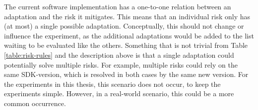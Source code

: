 The current software implementation has a one-to-one relation between an adaptation and the risk it mitigates. This means that an individual risk only has (at most) a single possible adaptation. Conceptually, this should not change or influence the experiment, as the additional adaptations would be added to the list waiting to be evaluated like the others. Something that is not trivial from Table \ref{table:risk-rules} and the description above is that a single adaptation could potentially solve multiple risks. For example, multiple risks could rely on the same SDK-version, which is resolved in both cases by the same new version. For the experiments in this thesis, this scenario does not occur, to keep the experiments simple. However, in a real-world scenario, this could be a more common occurrence.

